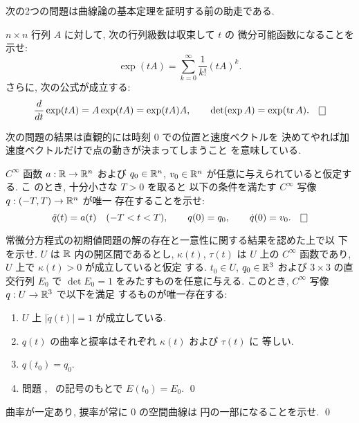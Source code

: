 \documentclass[12pt,twoside]{jarticle}
\newcommand\qstar[1]{}
\begin{document}
次の2つの問題は曲線論の基本定理を証明する前の助走である.

\begin{question}[行列の指数函数]\label{q:mat-exp}\qstar{*}
  $n \times n$ 行列 $A$ に対して, 次の行列級数は収束して $t$ の %
  微分可能函数になることを示せ:
  \[
    \exp(tA) = \sum_{k=0}^\infty \frac{1}{k!} (tA)^k.
  \]
  さらに, 次の公式が成立する:
  \[
    \frac{d}{dt} \exp(tA) = A \exp(tA) = \exp(tA) A,
    \qquad
    \det(\exp A) = \exp(\trace A).
  \qed
  \]
\end{question}

次の問題の結果は直観的には時刻 $0$ での位置と速度ベクトルを
決めてやれば加速度ベクトルだけで点の動きが決まってしまうこと
を意味している.

\begin{question}
 $C^\infty$ 函数 $a : {\mathbb R} \to {\mathbb R}^n$ および %
 $q_0 \in {\mathbb R}^n$, $v_0 \in {\mathbb R}^n$ が任意に与えられていると仮定する. こ
 のとき, 十分小さな $T>0$ を取ると
 以下の条件を満たす $C^\infty$ 写像 $q : (-T,T) \to {\mathbb R}^n$ が唯一
 存在することを示せ:
 \begin{equation*}
  \ddot{q}(t) = a(t) \quad (-T<t<T),
   \qquad
   q(0) = q_0,
   \qquad
   \dot{q}(0) = v_0.
   \qed
 \end{equation*}
\end{question}

\begin{question}[曲線論の基本定理]\qstar{*}
  常微分方程式の初期値問題の解の存在と一意性に関する結果を認めた上で以
  下を示せ. %
  $U$ は ${\mathbb R}$ 内の開区間であるとし, $\kappa(t)$, $\tau(t)$ は $U$ 上の
  $C^\infty$ 函数であり, $U$ 上で $\kappa(t) > 0$ が成立していると仮定
  する. $t_0 \in U$, $q_0 \in {\mathbb R}^3$ および $3 \times 3$ の直交行列 %
  $E_0$ で $\det E_0 = 1$ をみたすものを任意に与える. このとき, 
  $C^\infty$ 写像 $q : U \to {\mathbb R}^3$ で以下を満足
  するものが唯一存在する:
  \begin{enumerate}
  \item $U$ 上 $|\dot{q}(t)| = 1$ が成立している.
  \item $q(t)$ の曲率と捩率はそれぞれ $\kappa(t)$ および $\tau(t)$ に
    等しい.
  \item $q(t_0) = q_0$.
  \item 問題 , \ の記号のもとで $E(t_0) = E_0$.
  \qed
  \end{enumerate}
\end{question}

\begin{question}[円]
 曲率が一定あり, 捩率が常に $0$ の空間曲線は
 円の一部になることを示せ.
 \qed
\end{question}
\end{document}
